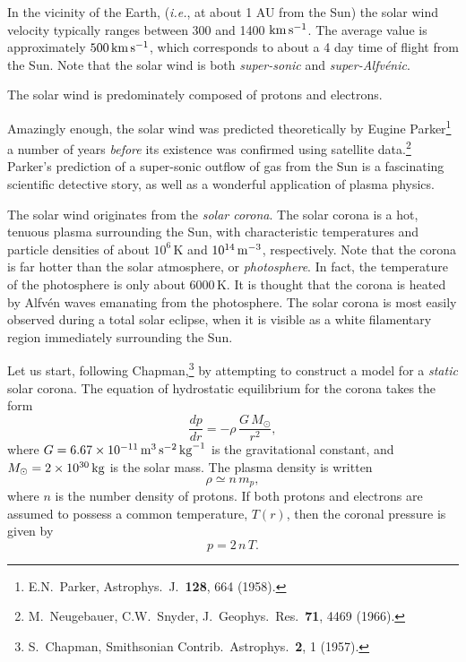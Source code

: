 In the vicinity of the Earth, ({\em i.e.}, at about 1 AU from the
Sun) the solar wind velocity typically
ranges between 300 and 1400 ${\rm km}\,{\rm s}^{-1}$. The average value
is approximately $500\,{\rm km}\,{\rm s}^{-1}$, which corresponds to about a
4 day time of flight from the Sun. Note that the solar wind is
both {\em super-sonic}\/ and {\em super-Alfv\'{e}nic}. 

The solar wind is predominately composed of protons and electrons. 

Amazingly enough, the solar wind was predicted
theoretically by Eugine Parker\footnote{E.N.~Parker, Astrophys.\ J.\ {\bf 128},
664 (1958).}
 a number of years {\em before}\/ its
existence 
was confirmed using satellite data.\footnote{M.~Neugebauer, C.W.~Snyder, J.~Geophys.\
Res.\ {\bf 71}, 4469 (1966).} Parker's prediction of a super-sonic
outflow of gas from the Sun  is a
fascinating scientific detective story, as well as a wonderful application
of plasma physics. 

The solar wind originates from the {\em solar corona}. The solar corona
is a hot, tenuous plasma surrounding the Sun, with characteristic temperatures and
particle densities of about $10^6$\,K and $10^{14}\,{\rm m}^{-3}$,
respectively. Note that the corona is far hotter than the solar
atmosphere, or {\em photosphere}. In fact, the
temperature of the photosphere is  only about $6000$\,K. It is
thought that the corona is heated by Alfv\'{e}n waves emanating from the
photosphere. The solar corona is most easily observed during a total
solar eclipse, when it is visible as a white filamentary region
immediately surrounding the Sun. 

Let us start, following Chapman,\footnote{S.~Chapman, Smithsonian Contrib.\
Astrophys.\ {\bf 2}, 1 (1957).} by attempting
to construct a model for a {\em static}\/ solar corona. The equation
of hydrostatic equilibrium for the corona takes the form 
\begin{equation}\label{e5.36}
\frac{dp}{dr} = - \rho\,\frac{G\,M_\odot}{r^2},
\end{equation}
where $G= 6.67\times 10^{-11}\,{\rm m}^{3}\,{\rm s}^{-2}\,{\rm kg}^{-1}$
is the gravitational constant, and $M_\odot=2\times 10^{30}\,{\rm kg}$ is
the solar mass. 
The plasma density is written 
\begin{equation}\label{e5.37}
\rho\simeq n\,m_p, 
\end{equation}
where $n$ is the number
density of protons. If both protons and electrons are assumed
to possess a common temperature, $T(r)$, then the coronal pressure is
given by
\begin{equation}\label{e5.38}
p = 2\,n\,T.
\end{equation}

